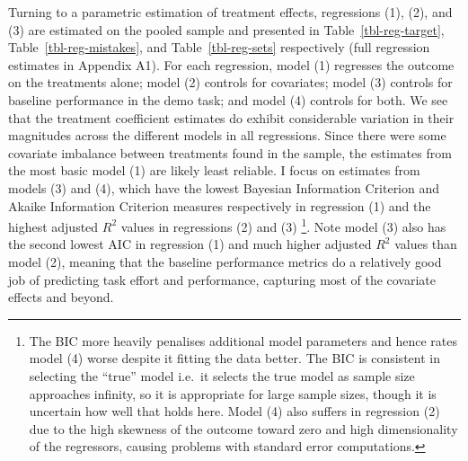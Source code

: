 \documentclass[
  12,
  letterpaper,
  DIV=11,
  numbers=noendperiod]{scrartcl}
\begin{document}
Turning to a parametric estimation of treatment effects, regressions
(1), (2), and (3) are estimated on the pooled sample and presented in
Table~\ref{tbl-reg-target}, Table~\ref{tbl-reg-mistakes}, and
Table~\ref{tbl-reg-sets} respectively (full regression estimates in
Appendix A1). For each regression, model (1) regresses the outcome on
the treatments alone; model (2) controls for covariates; model (3)
controls for baseline performance in the demo task; and model (4)
controls for both. We see that the treatment coefficient estimates do
exhibit considerable variation in their magnitudes across the different
models in all regressions. Since there were some covariate imbalance
between treatments found in the sample, the estimates from the most
basic model (1) are likely least reliable. I focus on estimates from
models (3) and (4), which have the lowest Bayesian Information Criterion
and Akaike Information Criterion measures respectively in regression (1)
and the highest adjusted \(R^2\) values in regressions (2) and (3)
\footnote{The BIC more heavily penalises additional model parameters and
  hence rates model (4) worse despite it fitting the data better. The
  BIC is consistent in selecting the ``true'' model i.e.~it selects the
  true model as sample size approaches infinity, so it is appropriate
  for large sample sizes, though it is uncertain how well that holds
  here. Model (4) also suffers in regression (2) due to the high
  skewness of the outcome toward zero and high dimensionality of the
  regressors, causing problems with standard error computations.}. Note
model (3) also has the second lowest AIC in regression (1) and much
higher adjusted \(R^2\) values than model (2), meaning that the baseline
performance metrics do a relatively good job of predicting task effort
and performance, capturing most of the covariate effects and beyond.
\end{document}

